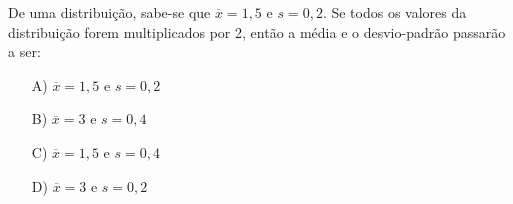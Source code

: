 De uma distribuição, sabe-se que $\overline{x} = 1,5$ e $s = 0,2$. Se todos os valores da distribuição forem multiplicados por 2, então a média e o desvio-padrão passarão a ser:
\begin{enumerate}
\item [A)] $\overline{x} = 1,5$ e $s = 0,2$
\item [B)] $\overline{x} = 3$ e $s = 0,4$
\item [C)] $\overline{x} = 1,5$ e $s = 0,4$
\item [D)] $\overline{x} = 3$ e $s = 0,2$
\end{enumerate}
